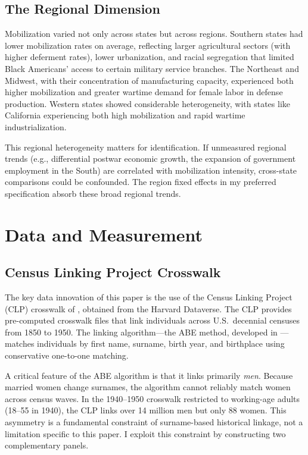 \documentclass[12pt]{article}
\begin{document}
\subsection{The Regional Dimension}

Mobilization varied not only across states but across regions. Southern states had lower mobilization rates on average, reflecting larger agricultural sectors (with higher deferment rates), lower urbanization, and racial segregation that limited Black Americans' access to certain military service branches. The Northeast and Midwest, with their concentration of manufacturing capacity, experienced both higher mobilization and greater wartime demand for female labor in defense production. Western states showed considerable heterogeneity, with states like California experiencing both high mobilization and rapid wartime industrialization.

This regional heterogeneity matters for identification. If unmeasured regional trends (e.g., differential postwar economic growth, the expansion of government employment in the South) are correlated with mobilization intensity, cross-state comparisons could be confounded. The region fixed effects in my preferred specification absorb these broad regional trends.



\section{Data and Measurement}
\label{sec:data}

\subsection{Census Linking Project Crosswalk}

The key data innovation of this paper is the use of the Census Linking Project (CLP) crosswalk of \citet{abramitzky2025clp}, obtained from the Harvard Dataverse. The CLP provides pre-computed crosswalk files that link individuals across U.S.\ decennial censuses from 1850 to 1950. The linking algorithm---the ABE method, developed in \citet{abramitzky2012europe, abramitzky2014nation}---matches individuals by first name, surname, birth year, and birthplace using conservative one-to-one matching.

A critical feature of the ABE algorithm is that it links primarily \textit{men}. Because married women change surnames, the algorithm cannot reliably match women across census waves. In the 1940--1950 crosswalk restricted to working-age adults (18--55 in 1940), the CLP links over 14 million men but only 88 women. This asymmetry is a fundamental constraint of surname-based historical linkage, not a limitation specific to this paper. I exploit this constraint by constructing two complementary panels.
\end{document}
